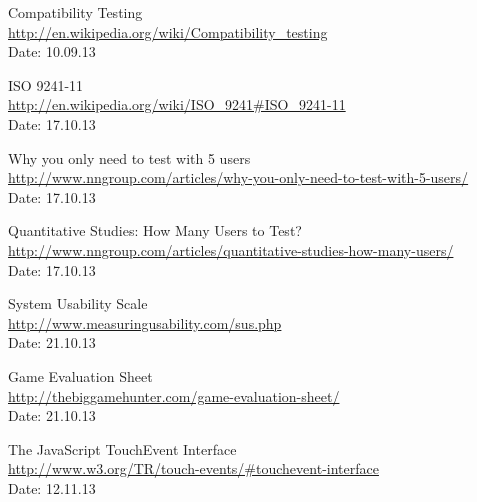 \begin{thebibliography}{99}
	Compatibility Testing \\
	\href {http://en.wikipedia.org/wiki/Compatibility_testing}{http://en.wikipedia.org/wiki/Compatibility\_testing} \\
	Date: 10.09.13

	ISO 9241-11 \\
	\href {http://en.wikipedia.org/wiki/ISO_9241#ISO_9241-11}{http://en.wikipedia.org/wiki/ISO\_9241\#ISO\_9241-11} \\
	Date: 17.10.13

	Why you only need to test with 5 users \\
	\href {http://www.nngroup.com/articles/why-you-only-need-to-test-with-5-users/}{http://www.nngroup.com/articles/why-you-only-need-to-test-with-5-users/} \\
	Date: 17.10.13

	Quantitative Studies: How Many Users to Test? \\
	\href {http://www.nngroup.com/articles/quantitative-studies-how-many-users/}{http://www.nngroup.com/articles/quantitative-studies-how-many-users/} \\
	Date: 17.10.13

	System Usability Scale \\
	\href {http://www.measuringusability.com/sus.php}{http://www.measuringusability.com/sus.php} \\
	Date: 21.10.13 

	Game Evaluation Sheet \\
	\href {http://thebiggamehunter.com/game-evaluation-sheet/}{http://thebiggamehunter.com/game-evaluation-sheet/} \\
	Date: 21.10.13

  The JavaScript TouchEvent Interface \\
  \href {http://www.w3.org/TR/touch-events/\#touchevent-interface}{http://www.w3.org/TR/touch-events/\#touchevent-interface} \\
  Date: 12.11.13

\end{thebibliography}
\endgroup